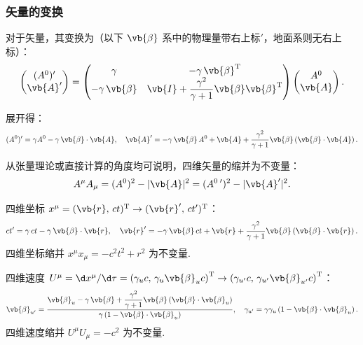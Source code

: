 \subsubsection{矢量的变换}

对于矢量，其变换为（以下 \(\vb{\beta}\) 系中的物理量带右上标\('\)，地面系则无右上标）：
\begin{equation*}
	\begin{pmatrix}
		(A^0)' \\
		\vb{A}'
	\end{pmatrix}
	=
	\begin{pmatrix}
		\gamma                & -\gamma \, \vb{\beta}^\mathrm{T}                                       \\
		-\gamma \, \vb{\beta} & \vb{I} + \dfrac{\gamma^2}{\gamma + 1} \vb{\beta} \vb{\beta}^\mathrm{T}
	\end{pmatrix}
	\begin{pmatrix}
		A^0 \\
		\vb{A}
	\end{pmatrix}.
\end{equation*}

展开得：
\begin{equation*}
	(A^0)' = \gamma A^0 - \gamma \, \vb{\beta} \cdot \vb{A}, \quad
	\vb{A}' = -\gamma \, \vb{\beta} \, A^0 + \vb{A} + \dfrac{\gamma^2}{\gamma + 1} \vb{\beta} \left( \vb{\beta} \cdot \vb{A} \right).
\end{equation*}

从张量理论或直接计算的角度均可说明，四维矢量的缩并为不变量：
\begin{equation*}
	A^\mu A_\mu = (A^0)^2 - |\vb{A}|^2 = (A^0\,')^2 - |\vb{A}'|^2.
\end{equation*}

\begin{example}
	四维坐标 \(x^\mu = (\vb{r}, \, ct)^\mathrm{T} \to (\vb{r}', \, ct')^\mathrm{T}\)：
	\begin{equation*}
		ct' = \gamma \, ct - \gamma \, \vb{\beta} \cdot \vb{r}, \quad
		\vb{r}' = -\gamma \, \vb{\beta} \, ct + \vb{r} + \dfrac{\gamma^2}{\gamma + 1} \vb{\beta} \left( \vb{\beta} \cdot \vb{r} \right).
	\end{equation*}
	四维坐标缩并 \(x^\mu x_\mu = -c^2 t^2 + r^2\) 为不变量.
\end{example}

\begin{example}
	四维速度 \(U^\mu = \d x^\mu/\d \tau = \left( \gamma_u c, \, \gamma_u \vb{\beta}_u c \right)^\mathrm{T} \to \left( \gamma_{u'} c, \, \gamma_{u'} \vb{\beta}_{u'} c \right)^\mathrm{T}\)：
	\begin{equation*}
		\vb{\beta}_{u'} = \dfrac{ \vb{\beta}_u - \gamma \, \vb{\beta} + \dfrac{\gamma^2}{\gamma + 1} \vb{\beta} \left( \vb{\beta} \cdot \vb{\beta}_u \right) }{ \gamma \left( 1 - \vb{\beta} \cdot \vb{\beta}_u \right) }, \quad
		\gamma_{u'} = \gamma \gamma_u \left( 1 - \vb{\beta} \cdot \vb{\beta}_u \right).
	\end{equation*}
	四维速度缩并 \(U^\mu U_\mu = -c^2\) 为不变量.
\end{example}

